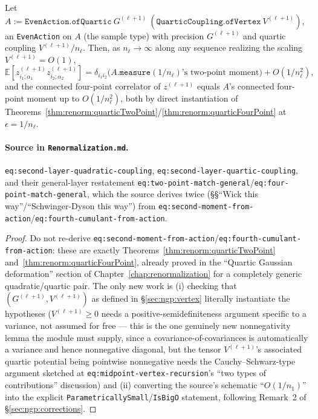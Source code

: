 \begin{theorem}
\label{thm:ngp:fourPointVertexMatch}
Let $A:=\texttt{EvenAction.ofQuartic}\ G^{(\ell+1)}\ (\texttt{QuarticCoupling.ofVertex}\
V^{(\ell+1)})$, an \texttt{EvenAction} on $A$ (the sample type) with precision $G^{(\ell+1)}$ and
quartic coupling $V^{(\ell+1)}/n_\ell$. Then, as $n_\ell\to\infty$ along any sequence realizing the
scaling $V^{(\ell+1)}=O(1)$,
\[
  \mathbb E[z^{(\ell+1)}_{i_1;\alpha_1}z^{(\ell+1)}_{i_2;\alpha_2}]
    = \delta_{i_1i_2}\big(A.\texttt{measure}(1/n_\ell)\text{'s two-point moment}\big)+O(1/n_\ell^2),
\]
and the connected four-point correlator of $z^{(\ell+1)}$ equals $A$'s connected four-point moment
up to $O(1/n_\ell^2)$, both by direct instantiation of
Theorems~\ref{thm:renorm:quarticTwoPoint}/\ref{thm:renorm:quarticFourPoint} at
$\epsilon=1/n_\ell$.

\paragraph{Source in \texttt{Renormalization.md}.}
\texttt{eq:second-layer-quadratic-coupling}, \texttt{eq:second-layer-quartic-coupling}, and their
general-layer restatement \texttt{eq:two-point-match-general}/\texttt{eq:four-point-match-general},
which the source derives twice (\S\S ``Wick this way''/``Schwinger-Dyson this way'') from
\texttt{eq:second-moment-from-action}/\texttt{eq:fourth-cumulant-from-action}.
\end{theorem}

\begin{proof}
Do not re-derive \texttt{eq:second-moment-from-action}/\texttt{eq:fourth-cumulant-from-action}:
these are exactly Theorems~\ref{thm:renorm:quarticTwoPoint} and~\ref{thm:renorm:quarticFourPoint},
already proved in the ``Quartic Gaussian deformation'' section of
Chapter~\ref{chap:renormalization} for a completely generic quadratic/quartic pair. The
only new work is (i) checking that $(G^{(\ell+1)},V^{(\ell+1)})$ as defined in
\S\ref{sec:ngp:vertex} literally instantiate the hypotheses ($V^{(\ell+1)}\geq0$ needs a
positive-semidefiniteness argument specific to a variance, not assumed for free — this is the one
genuinely new nonnegativity lemma the module must supply, since a covariance-of-covariances is
automatically a variance and hence nonnegative diagonal, but the tensor $V^{(\ell+1)}$'s associated
quartic potential being pointwise nonnegative needs the Cauchy--Schwarz-type argument sketched at
\texttt{eq:midpoint-vertex-recursion}'s ``two types of contributions'' discussion) and (ii)
converting the source's schematic ``$O(1/n_1)$'' into the explicit
\texttt{ParametricallySmall}/\texttt{IsBigO} statement, following
Remark~2 of \S\ref{sec:ngp:corrections}.
\end{proof}


